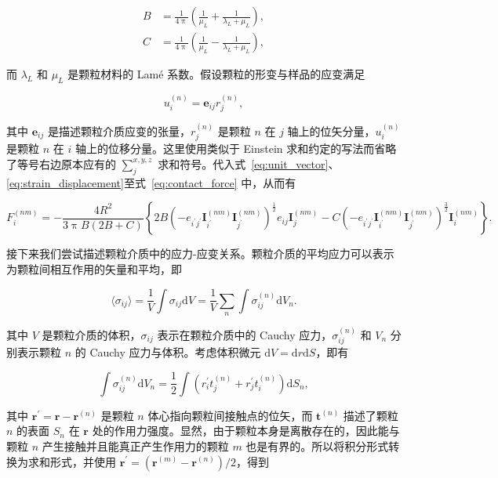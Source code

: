 \begin{align}
  B &= \frac{1}{4\uppi}\left(\frac{1}{\mu_{L}} + \frac{1}{\lambda_{L} + \mu_{L}}\right),\\
  C &= \frac{1}{4\uppi}\left(\frac{1}{\mu_{L}} - \frac{1}{\lambda_{L} + \mu_{L}}\right),
\end{align}

而 $\lambda_{L}$ 和 $\mu_{L}$ 是颗粒材料的 Lamé 系数。假设颗粒的形变与样品的应变满足

\begin{equation}
  {u}_{i}^{(n)} = \mathbf{e}_{ij}{r}_{j}^{(n)}\label{eq:strain_displacement},
\end{equation}

其中 $\mathbf{e}_{ij}$ 是描述颗粒介质应变的张量，${r}_{j}^{(n)}$ 是颗粒 $n$ 在 $j$ 轴上的位矢分量，${u}_{i}^{(n)}$ 是颗粒 $n$ 在 $i$ 轴上的位移分量。这里使用类似于 Einstein 求和约定的写法而省略了等号右边原本应有的 $\sum_{j}^{x,y,z}$ 求和符号。代入式~\eqref{eq:unit_vector}、\eqref{eq:strain_displacement}至式~\eqref{eq:contact_force} 中，从而有

\begin{equation}
  F_{i}^{(nm)} = -\frac{4R^{2}}{3\uppi B(2B+C)}\left\{2B\left(-e_{i^{\prime}j^{\prime}}\mathbf{I}_{i^{\prime}}^{(nm)}\mathbf{I}_{j^{\prime}}^{(nm)}\right)^{\frac{1}{2}}e_{ij}\mathbf{I}_{j}^{(nm)} - C\left(-e_{i^{\prime}j^{\prime}}\mathbf{I}^{(nm)}_{i^{\prime}}\mathbf{I}_{j^{\prime}}^{(nm)}\right)^{\frac{3}{2}}\mathbf{I}_{i}^{(nm)}\right\}.
\end{equation}

接下来我们尝试描述颗粒介质中的应力-应变关系。颗粒介质的平均应力可以表示为颗粒间相互作用的矢量和平均，即

\begin{equation}
  \langle\sigma_{ij}\rangle = \frac{1}{V}\int\sigma_{ij}\mathrm{d}V = \frac{1}{V}\sum_{n}\int\sigma_{ij}^{(n)}\mathrm{d}V_{n}.
\end{equation}

其中 $V$ 是颗粒介质的体积，$\sigma_{ij}$ 表示在颗粒介质中的 Cauchy 应力，$\sigma_{ij}^{(n)}$ 和 $V_{n}$ 分别表示颗粒 $n$ 的 Cauchy 应力与体积。考虑体积微元 $\mathrm{d}V = \mathrm{d}r\mathrm{d}S$，即有

\begin{equation}
  \int\sigma_{ij}^{(n)}\mathrm{d}V_{n} = \frac{1}{2}\int\left(r_{i}^{\prime}t_{j}^{(n)} + r_{j}^{\prime}t_{i}^{(n)}\right)\mathrm{d}S_{n},
\end{equation}

其中 $\mathbf{r}^{\prime} = \mathbf{r} - \mathbf{r}^{(n)} $ 是颗粒 $n$ 体心指向颗粒间接触点的位矢，而 $\mathbf{t}^{(n)}$ 描述了颗粒 $n$ 的表面 $S_{n}$ 在 $\mathbf{r}$ 处的作用力强度。显然，由于颗粒本身是离散存在的，因此能与颗粒 $n$ 产生接触并且能真正产生作用力的颗粒 $m$ 也是有界的。所以将积分形式转换为求和形式，并使用 $\mathbf{r}^{\prime} = \left(\mathbf{r}^{(m)} - \mathbf{r}^{(n)}\right)/2$，得到

